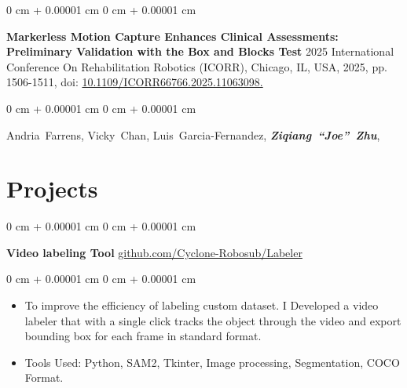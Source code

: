 \documentclass[10pt, letterpaper]{article}
\newenvironment{highlights}{
    \begin{itemize}[
        topsep=0.10 cm,
        parsep=0.10 cm,
        partopsep=0pt,
        itemsep=0pt,
        leftmargin=0 cm + 10pt
    ]
}{
    \end{itemize}
} %
\newenvironment{onecolentry}{
    \begin{adjustwidth}{
        0 cm + 0.00001 cm
    }{
        0 cm + 0.00001 cm
    }
}{
    \end{adjustwidth}
} %
\newenvironment{twocolentry}[2][]{
    \onecolentry
    \def\secondColumn{#2}
    \setcolumnwidth{\fill, 6 cm}
    \begin{paracol}{2}
}{
    \switchcolumn \raggedleft \secondColumn
    \end{paracol}
    \endonecolentry
} %
\begin{document}
        
        \begin{samepage}
            \begin{onecolentry}
                \textbf{Markerless Motion Capture Enhances Clinical Assessments: Preliminary Validation with the Box and Blocks Test} 2025 International Conference On Rehabilitation Robotics (ICORR), Chicago, IL, USA, 2025, pp. 1506-1511, doi: \href{https://doi.org/10.1109/ICORR66766.2025.11063098}{10.1109/ICORR66766.2025.11063098.}
                \label{pub:markerless-motion-capture}
            \end{onecolentry}

            \vspace{0.10 cm}
            
            \begin{onecolentry}
                \mbox{Andria Farrens}, \mbox{Vicky Chan}, \mbox{Luis Garcia-Fernandez}, \mbox{\textbf{\textit{Ziqiang “Joe” Zhu}}},

                \vspace{0.10 cm}
                
        \end{onecolentry}
        \end{samepage}


    
    \section{Projects}



        
        \begin{twocolentry}{
            \href{https://github.com/Cyclone-Robosub/Labeler}{github.com/Cyclone-Robosub/Labeler}
        }
            \textbf{Video labeling Tool}\end{twocolentry}

        \vspace{0.10 cm}
        \begin{onecolentry}
            \begin{highlights}
                \item To improve the efficiency of labeling custom dataset. I Developed a video labeler that with a single click tracks the object through the video and export bounding box for each frame in standard format.  
                \item Tools Used: Python, SAM2, Tkinter, Image processing, Segmentation, COCO Format. 
            \end{highlights}
        \end{onecolentry}
\end{document}
